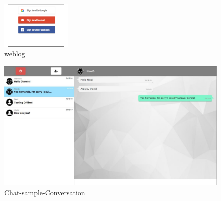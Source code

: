 \begin{figure}[ht]
\centering
\includegraphics[width=0.3\textwidth]{figs/weblog}
	\caption{weblog }
	\label{fig:weblog}
\end{figure}

\begin{figure}[ht]
\centering
\includegraphics[width=1\textwidth]{figs/Chat-sample-Conversation}
	\caption{Chat-sample-Conversation }
	\label{fig:Chat-sample-Conversation}
\end{figure}

